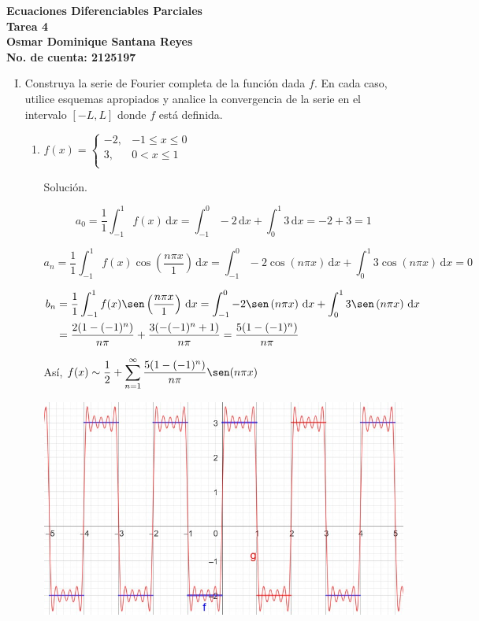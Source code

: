 \documentclass[fleqn]{article}
\newcommand{\intg}[3]{\int_{#1}^{#2} #3 \, \mathrm{d}x}
\begin{document}
	\bfseries
	Ecuaciones Diferenciables Parciales \\
	Tarea 4 \\
	Osmar Dominique Santana Reyes \\
	No. de cuenta: 2125197 \\

	\begin{enumerate}[I.]
		\item Construya la serie de Fourier completa de la función dada $f$. En cada caso, utilice esquemas apropiados y analice la convergencia de la serie en el intervalo $ [-L,L] $ donde $f$ está definida.
		
		\begin{enumerate}[(1)]
			\item $ f(x) = \begin{cases}
				-2, & -1 \leq x \leq 0 \\
				3, & 0 < x \leq 1 \\
			\end{cases} $

			Solución.

			\normalfont

			\begin{equation*}
				a_0 = \dfrac{1}{1} \intg{-1}{1}{f(x)} = \intg{-1}{0}{-2} + \intg{0}{1}{3} = -2 + 3 = 1
			\end{equation*}

			\begin{equation*}
				a_n = \dfrac{1}{1} \intg{-1}{1}{f(x) \cos \left( \dfrac{n \pi x}{1} \right)} = \intg{-1}{0}{-2 \cos \left(n \pi x \right)} + \intg{0}{1}{3 \cos \left(n \pi x \right)} = 0
			\end{equation*}

			\begin{align*}
				b_n &= \dfrac{1}{1} \intg{-1}{1}{f(x) \sen \left( \dfrac{n \pi x}{1} \right)} = \intg{-1}{0}{-2 \sen \left(n \pi x \right)} + \intg{0}{1}{3 \sen \left(n \pi x \right)} \\
				&= \dfrac{2(1 - (-1)^n)}{n \pi} + \dfrac{3(-(-1)^n + 1)}{n \pi} = \dfrac{5(1 - (-1)^n)}{n \pi}
			\end{align*}

			Así, $ \displaystyle f(x) \sim \dfrac{1}{2} + \sum_{n=1}^{\infty} \dfrac{5(1 - (-1)^n)}{n \pi} \sen (n \pi x) $

			\includegraphics[width=0.95\linewidth]{Ejer1.jpg}


\end{enumerate}
\end{enumerate}
\end{document}
